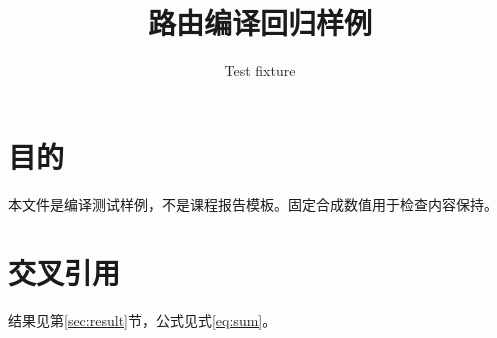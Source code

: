 \documentclass{article}
\title{路由编译回归样例}
\author{Test fixture}
\date{}
\begin{document}
\maketitle
\tableofcontents
\section{目的}
本文件是编译测试样例，不是课程报告模板。固定合成数值用于检查内容保持。

\section{交叉引用}
结果见第\ref{sec:result}节，公式见式\eqref{eq:sum}。
\end{document}
